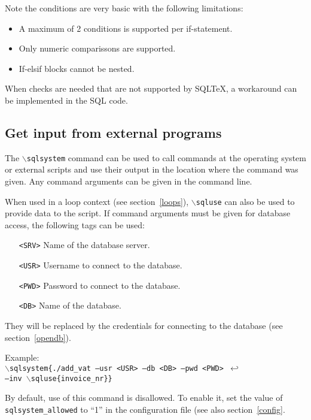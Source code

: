 \documentclass{article}
\newcommand{\bs}{\ensuremath{\backslash}}
\newcommand{\vs}{\vspace{3mm}}
\begin{document}
\vs

Note the conditions are very basic with the following limitations:
\begin{itemize}
\item A maximum of 2 conditions is supported per if-statement.
\item Only numeric comparissons are supported.
\item If-elsif blocks cannot be nested.
\end{itemize}

When checks are needed that are not supported by SQL\TeX, a workaround can be implemented in the SQL code.


\subsection{Get input from external programs}\label{sqlsystem}

The \texttt{\bs sqlsystem} command can be used to call commands at the operating system or external scripts and use their output in the location where the command was given. Any command arguments can be given in the command line.

When used in a loop context (see section~\ref{loops}), \texttt{\bs sqluse} can also be used to  provide data to the script. If command arguments must be given for database access, the following tags can be used:

\begin{itemize}
\item[\texttt{<SRV>}] Name of the database server.
\item[\texttt{<USR>}] Username to connect to the database.
\item[\texttt{<PWD>}] Password to connect to the database.
\item[\texttt{<DB>}] Name of the database.
\end{itemize}

They will be replaced by the credentials for connecting to the database (see section~\ref{opendb}).


\vs

\noindent Example:\\
\texttt{\bs sqlsystem\{./add\_vat --usr <USR> --db <DB> --pwd <PWD> $\hookleftarrow$ \\
--inv \bs sqluse\{invoice\_nr\}\}}

\vs

By default, use of this command is disallowed. To enable it, set the value of \texttt{sqlsystem\_allowed} to ``1'' in the configuration file (see also section~\ref{config}.
\end{document}
